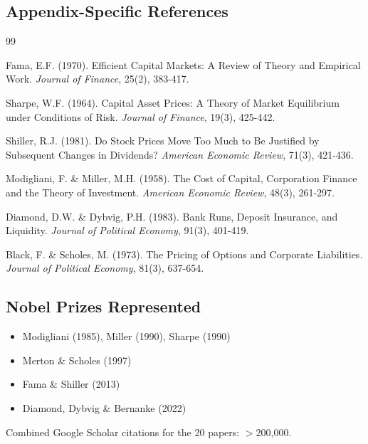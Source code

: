 \subsection{Appendix-Specific References}

\begin{thebibliography}{99}

 Fama, E.F. (1970). Efficient Capital Markets: A Review of Theory and Empirical Work. \textit{Journal of Finance}, 25(2), 383-417.

 Sharpe, W.F. (1964). Capital Asset Prices: A Theory of Market Equilibrium under Conditions of Risk. \textit{Journal of Finance}, 19(3), 425-442.

 Shiller, R.J. (1981). Do Stock Prices Move Too Much to Be Justified by Subsequent Changes in Dividends? \textit{American Economic Review}, 71(3), 421-436.

 Modigliani, F. \& Miller, M.H. (1958). The Cost of Capital, Corporation Finance and the Theory of Investment. \textit{American Economic Review}, 48(3), 261-297.

 Diamond, D.W. \& Dybvig, P.H. (1983). Bank Runs, Deposit Insurance, and Liquidity. \textit{Journal of Political Economy}, 91(3), 401-419.

 Black, F. \& Scholes, M. (1973). The Pricing of Options and Corporate Liabilities. \textit{Journal of Political Economy}, 81(3), 637-654.

\end{thebibliography}

\subsection{Nobel Prizes Represented}

\begin{itemize}[nosep]
    \item Modigliani (1985), Miller (1990), Sharpe (1990)
    \item Merton \& Scholes (1997)
    \item Fama \& Shiller (2013)
    \item Diamond, Dybvig \& Bernanke (2022)
\end{itemize}

Combined Google Scholar citations for the 20 papers: $>$200,000.




